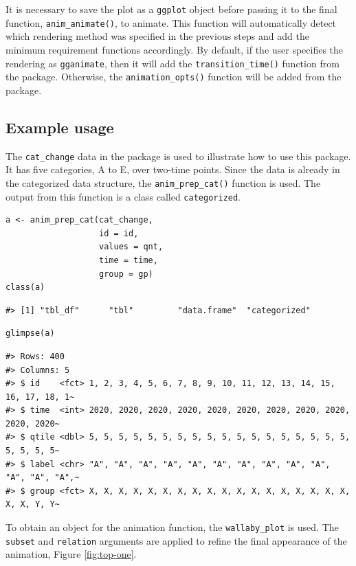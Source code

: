 It is necessary to save the plot as a \texttt{ggplot} object before passing it to the final function, \texttt{anim\_animate()}, to animate. This function will automatically detect which rendering method was specified in the previous steps and add the minimum requirement functions accordingly. By default, if the user specifies the rendering as \texttt{gganimate}, then it will add the \texttt{transition\_time()} function from the  package. Otherwise, the \texttt{animation\_opts()} function will be added from the  package.

\hypertarget{example-usage}{%
\subsection{Example usage}\label{example-usage}}

The \texttt{cat\_change} data in the package is used to illustrate how to use this package. It has five categories, A to E, over two-time points. Since the data is already in the categorized data structure, the \texttt{anim\_prep\_cat()} function is used. The output from this function is a class called \texttt{categorized}.

\begin{verbatim}
a <- anim_prep_cat(cat_change, 
                   id = id, 
                   values = qnt, 
                   time = time, 
                   group = gp)
class(a)
\end{verbatim}

\begin{verbatim}
#> [1] "tbl_df"      "tbl"         "data.frame"  "categorized"
\end{verbatim}

\begin{verbatim}
glimpse(a)
\end{verbatim}

\begin{verbatim}
#> Rows: 400
#> Columns: 5
#> $ id    <fct> 1, 2, 3, 4, 5, 6, 7, 8, 9, 10, 11, 12, 13, 14, 15, 16, 17, 18, 1~
#> $ time  <int> 2020, 2020, 2020, 2020, 2020, 2020, 2020, 2020, 2020, 2020, 2020~
#> $ qtile <dbl> 5, 5, 5, 5, 5, 5, 5, 5, 5, 5, 5, 5, 5, 5, 5, 5, 5, 5, 5, 5, 5, 5~
#> $ label <chr> "A", "A", "A", "A", "A", "A", "A", "A", "A", "A", "A", "A", "A",~
#> $ group <fct> X, X, X, X, X, X, X, X, X, X, X, X, X, X, X, X, X, X, X, X, Y, Y~
\end{verbatim}

To obtain an object for the animation function, the \texttt{wallaby\_plot} is used. The \texttt{subset} and \texttt{relation} arguments are applied to refine the final appearance of the animation, Figure \ref{fig:top-one}.

